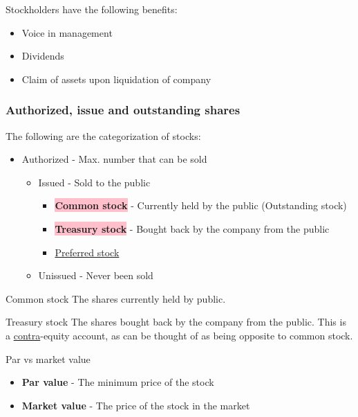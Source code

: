 Stockholders have the following benefits:

\begin{itemize}
    \item Voice in management
    \item Dividends
    \item Claim of assets upon liquidation of company
\end{itemize}

\subsubsection{Authorized, issue and outstanding shares}

The following are the categorization of stocks:

\begin{itemize}
    \item Authorized - Max. number that can be sold
          \begin{itemize}
              \item Issued - Sold to the public
                    \begin{itemize}
                        \item \colorbox{pink}{\textbf{Common stock}} - Currently held by the public (Outstanding stock)
                        \item \colorbox{pink}{\textbf{Treasury stock}} - Bought back by the company from the public
                        \item \hyperref[def:preferred_stock]{Preferred stock}
                    \end{itemize}
              \item Unissued - Never been sold
          \end{itemize}
\end{itemize}

\begin{definition}
    {Common stock}
    The shares currently held by public.
\end{definition}

\begin{definition}
    {Treasury stock}
    The shares bought back by the company from the public. This is a \hyperref[def:contra]{contra}-equity account, as can be thought of as being opposite to common stock.
\end{definition}

\begin{knBox}
    {Par vs market value}
    \begin{itemize}
        \item \textbf{Par value} - The minimum price of the stock
        \item \textbf{Market value} - The price of the stock in the market
    \end{itemize}
\end{knBox}
\label{def:par_market}

